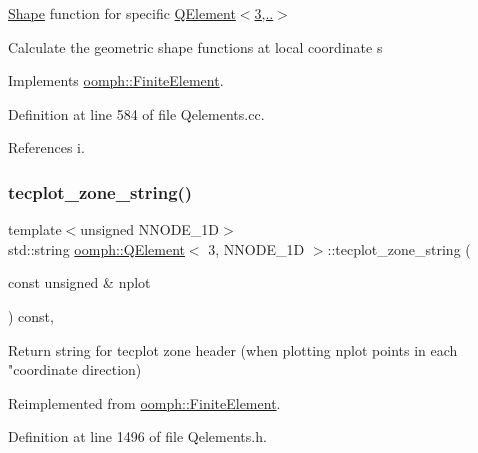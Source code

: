 \hyperlink{classoomph_1_1Shape}{Shape} function for specific \hyperlink{classoomph_1_1QElement_3_013_00_01NNODE__1D_01_4_a67a7cfffb80e609cdfd1ec534a9c19bd}{Q\+Element$<$3,..$>$}

Calculate the geometric shape functions at local coordinate s 

Implements \hyperlink{classoomph_1_1FiniteElement_a58a25b6859ddd43b7bfe64a19fee5023}{oomph\+::\+Finite\+Element}.



Definition at line 584 of file Qelements.\+cc.



References i.

\mbox{\label{classoomph_1_1QElement_3_013_00_01NNODE__1D_01_4_aa126ecfc38839bd7338db16d6d8f09d9}} 
\subsubsection{\texorpdfstring{tecplot\+\_\+zone\+\_\+string()}{tecplot\_zone\_string()}}
{\footnotesize\ttfamily template$<$unsigned N\+N\+O\+D\+E\+\_\+1D$>$ \\
std\+::string \hyperlink{classoomph_1_1QElement}{oomph\+::\+Q\+Element}$<$ 3, N\+N\+O\+D\+E\+\_\+1D $>$\+::tecplot\+\_\+zone\+\_\+string (\begin{DoxyParamCaption}\item[{const unsigned \&}]{nplot }\end{DoxyParamCaption}) const\hspace{0.3cm}{\ttfamily [inline]}, {\ttfamily [virtual]}}



Return string for tecplot zone header (when plotting nplot points in each "coordinate direction) 



Reimplemented from \hyperlink{classoomph_1_1FiniteElement_a3193df31f9ce38e0609d17a8ffb386c6}{oomph\+::\+Finite\+Element}.



Definition at line 1496 of file Qelements.\+h.


